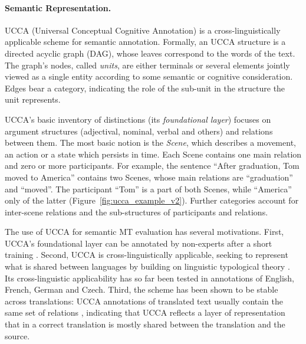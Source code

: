 \documentclass[11pt,letterpaper]{article}
\newcommand{\figref}[1]{Figure~\ref{#1}}
\def\parcite#1{\cite{#1}}
\begin{document}
\paragraph{Semantic Representation.}
UCCA (Universal Conceptual Cognitive Annotation) \cite{abend2013universal} is a
cross-linguistically applicable scheme for semantic annotation.
Formally, an UCCA structure is a directed acyclic graph (DAG),
whose leaves correspond to the words of the text.
The graph's nodes, called {\it units}, are either terminals or several elements jointly
viewed as a single entity according to some semantic or cognitive consideration. Edges bear
a category, indicating the role of the sub-unit in the structure the unit
represents.

UCCA's basic inventory of distinctions (its {\it foundational layer})
focuses on argument structures (adjectival, nominal, verbal and others)
and relations between them. The most basic notion is the {\it Scene}, which describes a movement, an
action or a state which persists in time. Each Scene contains one main
relation and zero or more participants. For example, the sentence ``After graduation, Tom moved to America''
contains two Scenes, whose main relations are ``graduation'' and ``moved''.
The participant ``Tom'' is a part of both Scenes, while ``America'' only of the
latter (\figref{fig:ucca_example_v2}). Further categories account for
inter-scene relations and the sub-structures of participants and relations.

The use of UCCA for semantic MT evaluation has several motivations. 
First, UCCA's foundational layer can be annotated by non-experts after a short training
\parcite{abend2013universal,marinotti2014}.
Second, UCCA is cross-linguistically applicable, seeking to
represent what is shared between languages by building on
linguistic typological theory \parcite{Dixon:10a,Dixon:10b,Dixon:12}.
Its cross-linguistic applicability has so far been tested in annotations of
English, French, German and Czech.
Third, the scheme has been shown to be stable across translations:
UCCA annotations of translated text usually contain the same set of relations
\parcite{sulem2015conceptual}, indicating that UCCA reflects a layer of
representation that in a correct translation is mostly shared between
the translation and the source.

\end{document}
